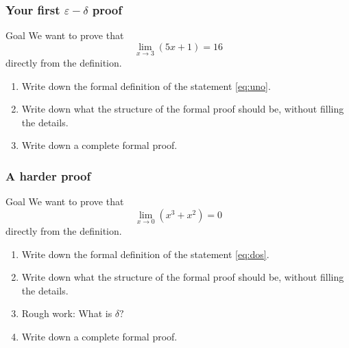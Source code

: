 \documentclass[14pt]{beamer}
\begin{document}
\begin{frame}[t]
	\frametitle{Your first $\varepsilon-\delta$ proof}

	\begin{block}{Goal}
		We want to prove that
		\begin{equation}
			\label{eq:uno}\lim_{x \to 3}\left( 5x + 1 \right) = 16
		\end{equation}
		directly from the definition.
	\end{block}
	\vfill
	\begin{enumerate}

		\item Write down the formal definition of the statement \eqref{eq:uno}.

		\item Write down what the structure of the formal proof should be, without
			filling the details.

		\item Write down a complete formal proof.
	\end{enumerate}
	\vfill
\end{frame}

\begin{frame}
	\frametitle{A harder proof}

	\begin{block}{Goal}
		We want to prove that
		\begin{equation}
			\label{eq:dos}\lim_{x \to 0}\left( x^{3}+ x^{2}\right) = 0
		\end{equation}
		directly from the definition.
	\end{block}
	\vfill
	\begin{enumerate}

		\item Write down the formal definition of the statement \eqref{eq:dos}.

		\item Write down what the structure of the formal proof should be, without
			filling the details.

		\item Rough work: What is $\delta?$

		\item Write down a complete formal proof.
	\end{enumerate}
	\vfill
\end{frame}
\end{document}
